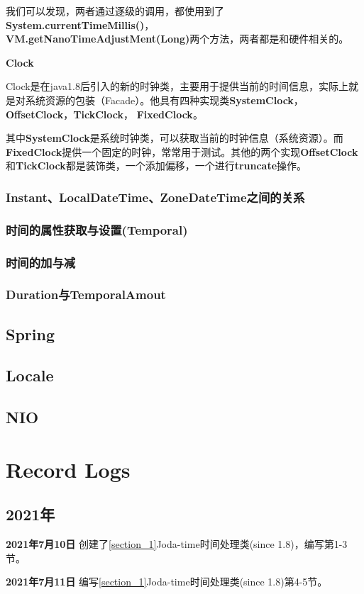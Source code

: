 \documentclass[cn,10pt,math=newtx,citestyle=gb7714-2015,bibstyle=gb7714-2015]{elegantbook}
\begin{document}
    我们可以发现，两者通过逐级的调用，都使用到了\textbf{System.currentTimeMillis()}，\\ \textbf{VM.getNanoTimeAdjustMent(Long)}两个方法，两者都是和硬件相关的。

    \textbf{Clock}
    
    Clock是在java1.8后引入的新的时钟类，主要用于提供当前的时间信息，实际上就是对系统资源的包装（Facade）。他具有四种实现类\textbf{SystemClock}，\textbf{OffsetClock}，\textbf{TickClock}，
    \textbf{FixedClock}。
    
    其中\textbf{SystemClock}是系统时钟类，可以获取当前的时钟信息（系统资源）。而\textbf{FixedClock}提供一个固定的时钟，常常用于测试。其他的两个实现\textbf{OffsetClock}和\textbf{TickClock}都是装饰类，一个添加偏移，一个进行\textbf{truncate}操作。

    \subsection{Instant、LocalDateTime、ZoneDateTime之间的关系}

    \subsection{时间的属性获取与设置(Temporal)}

    \subsection{时间的加与减}

    \subsection{Duration与TemporalAmout}

    \section{Spring}

    \section{Locale}

    \section{NIO}



    \chapter{Record Logs}

    \section{2021年}

    \textbf{2021年7月10日} 创建了\ref{section_1}Joda-time时间处理类(since 1.8)，编写第1-3节。
    
    \textbf{2021年7月11日} 编写\ref{section_1}Joda-time时间处理类(since 1.8)第4-5节。
    
\end{document}
